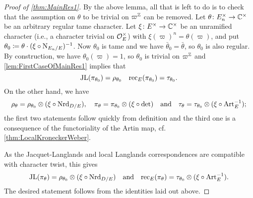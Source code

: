 \documentclass[../main.tex]{subfiles}
\begin{document}
\begin{proof}[Proof of \cref{thm:MainRes1}]
  By the above lemma, all that is left to do is to check that the 
  assumption on $\theta$ to be trivial on $\varpi^{\mathbb{Z}}$ can be removed.   
  Let $\theta\colon E_n^\times \to \mathbb{C}^\times$ be an arbitrary regular
  tame character. Let $\xi\colon E^\times \to \mathbb{C}^\times$ be an unramified character 
  (i.e., a character trivial on $\mathcal{O}_E^\times$) with $\xi(\varpi)^n =
  \theta(\varpi)$, and put $\theta_0 \coloneqq \theta \cdot (\xi \circ
  \operatorname{N}_{E_n/E})^{-1}$. Now $\theta_0$ is tame and we have $\bar \theta_0 =
  \bar \theta$, so $\theta_0$ is also regular. By construction, we have
  $\theta_0(\varpi) = 1$, so $\theta_0$ is trivial on $\varpi^{\mathbb{Z}}$ and
  \cref{lem:FirstCaseOfMainRes1} implies that 
  $$\mathrm{JL}(\pi_{\theta_0}) = \rho_{\theta_0} \quad \mathrm{rec}_E(\pi_{\theta_0}) =
  \tau_{\theta_0}.$$
  On the other hand, we have
  \begin{equation*}
    \rho_{\theta} = \rho_{\theta_0} \otimes (\xi \circ \operatorname{Nrd}_{D/E}),
      \quad 
    \pi_{\theta} = \pi_{\theta_0} \otimes (\xi \circ \det)
      \quad \text{and} \quad
    \tau_{\theta} = \tau_{\theta_0} \otimes (\xi \circ \operatorname{Art}_E^{-1});
  \end{equation*}
  the first two statements follow quickly from definition and the third one
  is a consequence of the functoriality of the Artin map, cf.
  \cref{thm:LocalKroneckerWeber}.
  
  As the Jacquet-Langlands and local Langlands correspondences are compatible
  with character twist, this gives
  \begin{equation*}
    \mathrm{JL}(\pi_\theta) = \rho_{\theta_0} \otimes (\xi \circ \operatorname{Nrd}_{D/E}) 
    \quad \text{and} \quad
    \mathrm{rec}_E(\pi_{\theta}) = \tau_{\theta_0} \otimes (\xi \circ \operatorname{Art}_E^{-1}).
  \end{equation*}
  The desired statement follows from the identities laid out above.
\end{proof}

\end{document}
